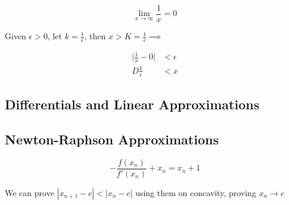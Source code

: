         \[
            \lim_{x\to \infty} \frac{1}{x} = 0
        \]

        Given $\epsilon > 0$, let $k=\frac{1}{\epsilon}$, then $x> K = \frac{1}{\epsilon}\implies$

        \begin{align*}
            \Big|\frac{1}{x}-0\Big| &< \epsilon \\D
            \frac{1}{\epsilon}      &< x
        \end{align*}


    \subsection{Differentials and Linear Approximations}

    \subsection{Newton-Raphson Approximations}

        \[
            -\frac{f(x_n)}{f'(x_n)} + x_n = x_n + 1
        \]

        We can prove $|x_{n+1}-c| < |x_n- c|$ using them on concavity, proving $x_n \rightarrow c$